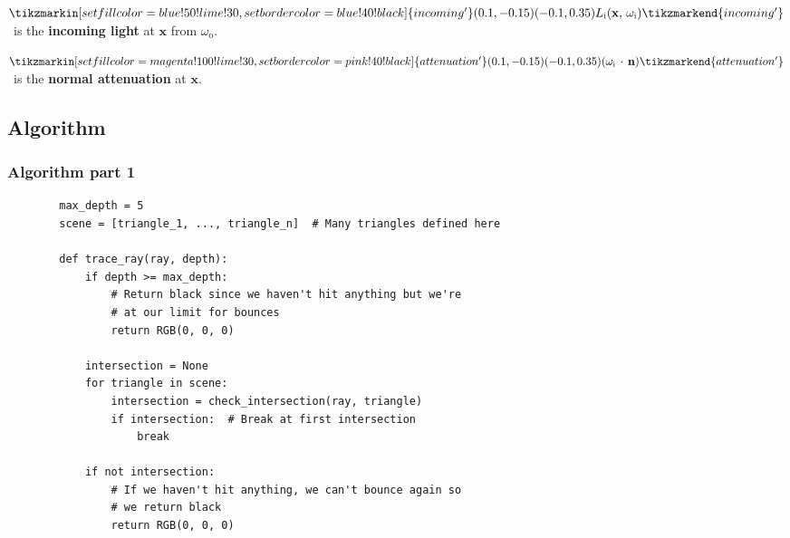 \documentclass{beamer}
\begin{document}
\begin{frame}
\(
    \tikzmarkin[set fill color=blue!50!lime!30,set border color=blue!40!black]{incoming'}(0.1,-0.15)(-0.1,0.35)
        L_{\text{i}}(\mathbf x,\, \omega_{\text{i}})
    \tikzmarkend{incoming'}
\)\, is the \textbf{incoming light} at \(\mathbf x\) from \(\omega_{\text{o}}\).

\smallskip
\(
    \tikzmarkin[set fill color=magenta!100!lime!30,set border color=pink!40!black]{attenuation'}(0.1,-0.15)(-0.1,0.35)
        (\omega_{\text{i}}\,\cdot\,\mathbf n)
    \tikzmarkend{attenuation'}
\)\, is the \textbf{normal attenuation} at \(\mathbf x\).
\end{frame}

\subsection{Algorithm}
\begin{frame}[fragile]
    \frametitle{Algorithm part 1}
    \scriptsize
    \begin{verbatim}
        max_depth = 5
        scene = [triangle_1, ..., triangle_n]  # Many triangles defined here

        def trace_ray(ray, depth):
            if depth >= max_depth:
                # Return black since we haven't hit anything but we're
                # at our limit for bounces
                return RGB(0, 0, 0) 

            intersection = None
            for triangle in scene:
                intersection = check_intersection(ray, triangle)
                if intersection:  # Break at first intersection
                    break

            if not intersection:
                # If we haven't hit anything, we can't bounce again so
                # we return black
                return RGB(0, 0, 0)
    \end{verbatim}
\end{frame}
\end{document}
